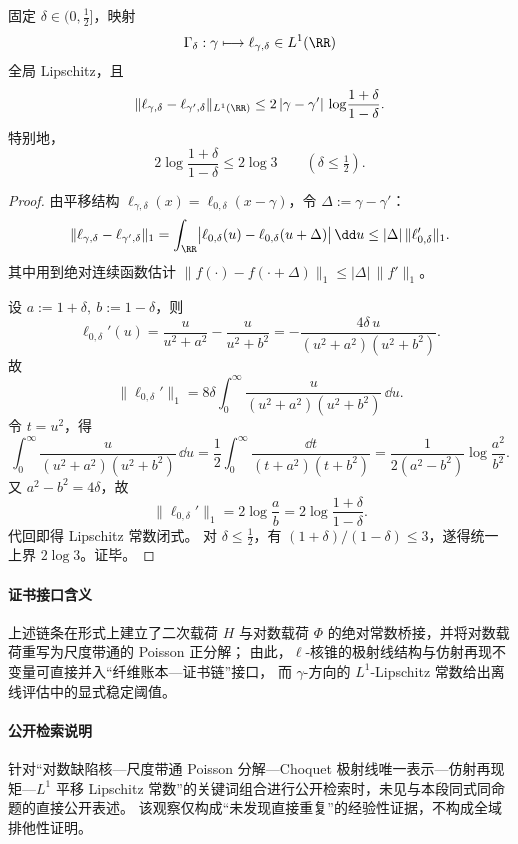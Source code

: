 \begin{theorem}\label{thm:xi-logdefect-gamma-translation-l1-lipschitz}
固定 \(\delta\in(0,\tfrac12]\)，映射
\[
\Gamma_\delta:\gamma\longmapsto \ell_{\gamma,\delta}\in L^1(\RR)
\]
全局 Lipschitz，且
\[
\|\ell_{\gamma,\delta}-\ell_{\gamma',\delta}\|_{L^1(\RR)}
\le
2\,|\gamma-\gamma'|\,\log\!\frac{1+\delta}{1-\delta}.
\]
特别地，
\[
2\log\!\frac{1+\delta}{1-\delta}\le 2\log 3
\qquad(\delta\le\tfrac12).
\]
\end{theorem}
\begin{proof}
由平移结构 \(\ell_{\gamma,\delta}(x)=\ell_{0,\delta}(x-\gamma)\)，令 \(\Delta:=\gamma-\gamma'\)：
\[
\|\ell_{\gamma,\delta}-\ell_{\gamma',\delta}\|_1
=
\int_{\RR}\bigl|\ell_{0,\delta}(u)-\ell_{0,\delta}(u+\Delta)\bigr|\,\dd u
\le
|\Delta|\,\|\ell_{0,\delta}'\|_1.
\]
其中用到绝对连续函数估计
\(
\|f(\cdot)-f(\cdot+\Delta)\|_1\le |\Delta|\,\|f'\|_1
\)。

设 \(a:=1+\delta,\ b:=1-\delta\)，则
\[
\ell_{0,\delta}'(u)
=
\frac{u}{u^2+a^2}-\frac{u}{u^2+b^2}
=
-\frac{4\delta\,u}{(u^2+a^2)(u^2+b^2)}.
\]
故
\[
\|\ell_{0,\delta}'\|_1
=
8\delta\int_0^\infty \frac{u}{(u^2+a^2)(u^2+b^2)}\,\dd u.
\]
令 \(t=u^2\)，得
\[
\int_0^\infty \frac{u}{(u^2+a^2)(u^2+b^2)}\,\dd u
=
\frac12\int_0^\infty\frac{\dd t}{(t+a^2)(t+b^2)}
=
\frac{1}{2(a^2-b^2)}\log\frac{a^2}{b^2}.
\]
又 \(a^2-b^2=4\delta\)，故
\[
\|\ell_{0,\delta}'\|_1
=
2\log\frac{a}{b}
=
2\log\frac{1+\delta}{1-\delta}.
\]
代回即得 Lipschitz 常数闭式。
对 \(\delta\le\tfrac12\)，有 \((1+\delta)/(1-\delta)\le 3\)，遂得统一上界 \(2\log3\)。证毕。
\end{proof}

\paragraph{证书接口含义}
上述链条在形式上建立了二次载荷 \(H\) 与对数载荷 \(\Phi\) 的绝对常数桥接，并将对数载荷重写为尺度带通的 Poisson 正分解；
由此，\(\ell\)-核锥的极射线结构与仿射再现不变量可直接并入“纤维账本—证书链”接口，
而 \(\gamma\)-方向的 \(L^1\)-Lipschitz 常数给出离线评估中的显式稳定阈值。

\paragraph{公开检索说明}
针对“对数缺陷核—尺度带通 Poisson 分解—Choquet 极射线唯一表示—仿射再现矩—\(L^1\) 平移 Lipschitz 常数”的关键词组合进行公开检索时，未见与本段同式同命题的直接公开表述。
该观察仅构成“未发现直接重复”的经验性证据，不构成全域排他性证明。

\endinput
